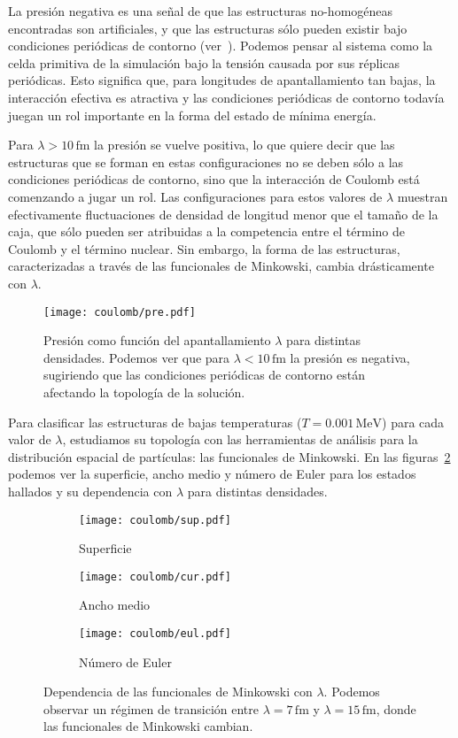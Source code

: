 La presión negativa es una señal de que las estructuras no-homogéneas encontradas son artificiales, y que las estructuras sólo pueden existir bajo condiciones periódicas de contorno (ver~\cite{binder_beyond_2012,gimenez_molinelli_simulations_2014}).
Podemos pensar al sistema como la celda primitiva de la simulación bajo la tensión causada por sus réplicas periódicas.
Esto significa que, para longitudes de apantallamiento tan bajas, la interacción efectiva es atractiva y las condiciones periódicas de contorno todavía juegan un rol importante en la forma del estado de mínima energía.

Para $\lambda>10\,\text{fm}$ la presión se vuelve positiva, lo que quiere decir que las estructuras que se forman en estas configuraciones no se deben sólo a las condiciones periódicas de contorno, sino que la interacción de Coulomb está comenzando a jugar un rol.
Las configuraciones para estos valores de $\lambda$ muestran efectivamente fluctuaciones de densidad de longitud menor que el tamaño de la caja, que sólo pueden ser atribuidas a la competencia entre el término de Coulomb y el término nuclear.
Sin embargo, la forma de las estructuras, caracterizadas a través de las funcionales de Minkowski, cambia drásticamente con $\lambda$.

\begin{figure}[h!]  \centering
\centering
\texttt{[image: coulomb/pre.pdf]}
\caption{Presión como función del apantallamiento $\lambda$ para distintas densidades.
  Podemos ver que para $\lambda<10\,\text{fm}$ la presión es negativa, sugiriendo que las condiciones periódicas de contorno están afectando la topología de la solución.}
\label{fig:pre}
\end{figure}

Para clasificar las estructuras de bajas temperaturas ($T=0.001\,\text{MeV}$) para cada valor de $\lambda$, estudiamos su topología con las herramientas de análisis para la distribución espacial de partículas: las funcionales de Minkowski.
En las figuras~\ref{fig:minkowski} podemos ver la superficie, ancho medio y número de Euler para los estados hallados y su dependencia con $\lambda$ para distintas densidades.

\begin{figure}[h!]  %
\centering
\begin{subfigure}[h!]{0.45\columnwidth}
  \centering
  \texttt{[image: coulomb/sup.pdf]}
  \caption{Superficie}
\end{subfigure}
\begin{subfigure}[h!]{0.45\columnwidth}
  \centering
  \texttt{[image: coulomb/cur.pdf]}
  \caption{Ancho medio}
\end{subfigure}
\begin{subfigure}[h!]{0.45\columnwidth}
  \centering
  \texttt{[image: coulomb/eul.pdf]}
  \caption{Número de Euler}
\end{subfigure}
\caption{Dependencia de las funcionales de Minkowski con $\lambda$.
  Podemos observar un régimen de transición entre $\lambda=7\,\text{fm}$ y $\lambda=15\,\text{fm}$, donde las funcionales de Minkowski cambian.}
\label{fig:minkowski}
\end{figure}

